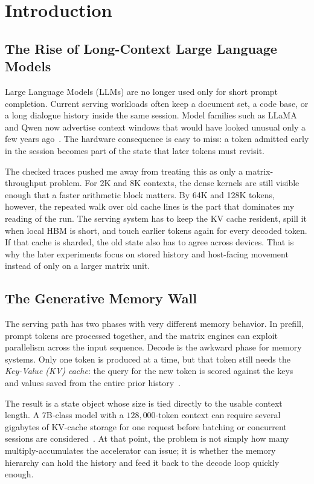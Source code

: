 \chapter{Introduction}
\label{ch:introduction}

\section{The Rise of Long-Context Large Language Models}
Large Language Models (LLMs) are no longer used only for short prompt completion. Current serving workloads often keep a document set, a code base, or a long dialogue history inside the same session. Model families such as LLaMA and Qwen now advertise context windows that would have looked unusual only a few years ago~\cite{llm_context, ring_attention}. The hardware consequence is easy to miss: a token admitted early in the session becomes part of the state that later tokens must revisit.

The checked traces pushed me away from treating this as only a matrix-throughput problem. For 2K and 8K contexts, the dense kernels are still visible enough that a faster arithmetic block matters. By 64K and 128K tokens, however, the repeated walk over old cache lines is the part that dominates my reading of the run. The serving system has to keep the KV cache resident, spill it when local HBM is short, and touch earlier tokens again for every decoded token. If that cache is sharded, the old state also has to agree across devices. That is why the later experiments focus on stored history and host-facing movement instead of only on a larger matrix unit.

\section{The Generative Memory Wall}
The serving path has two phases with very different memory behavior. In prefill, prompt tokens are processed together, and the matrix engines can exploit parallelism across the input sequence. Decode is the awkward phase for memory systems. Only one token is produced at a time, but that token still needs the \textit{Key-Value (KV) cache}: the query for the new token is scored against the keys and values saved from the entire prior history~\cite{vllm}.

The result is a state object whose size is tied directly to the usable context length. A 7B-class model with a $128{,}000$-token context can require several gigabytes of KV-cache storage for one request before batching or concurrent sessions are considered~\cite{vllm}. At that point, the problem is not simply how many multiply-accumulates the accelerator can issue; it is whether the memory hierarchy can hold the history and feed it back to the decode loop quickly enough.

